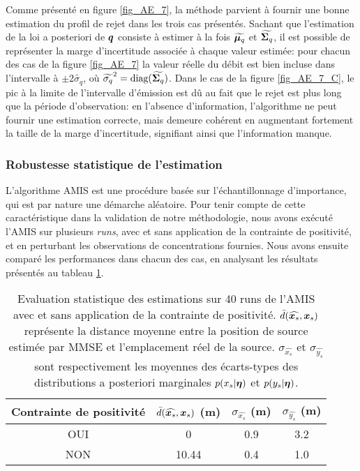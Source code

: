  Comme présenté en figure \ref{fig_AE_7}, la méthode parvient à fournir une bonne estimation du profil de rejet dans les trois cas présentés. Sachant que l'estimation de la loi a posteriori de ${\bm{q}}$ consiste à estimer à la fois ${\widetilde{{\bm{\mu}_q}}}$ et ${\widetilde{{\bm{\Sigma}_q}}}$, il est possible de représenter la marge d'incertitude associée à chaque valeur estimée: pour chacun des cas de la figure \ref{fig_AE_7} la valeur réelle du débit est bien incluse dans l'intervalle à $\pm 2\widetilde{\sigma_q}$, où $\widetilde{\sigma_q}^2 = \text{diag}({\widetilde{{\bm{\Sigma}_q}}})$. Dans le cas de la figure \ref{fig_AE_7_C}, le pic à la limite de l'intervalle d'émission est dû au fait que le rejet est plus long que la période d'observation: en l'absence d'information, l'algorithme ne peut fournir une estimation correcte, mais demeure cohérent  en augmentant fortement la taille de la marge d'incertitude, signifiant ainsi que l'information manque. \\
  
  \subsubsection{Robustesse statistique de l'estimation}
    
    L'algorithme AMIS est une procédure basée sur l'échantillonnage d'importance, qui est par nature une démarche aléatoire. Pour tenir compte de cette caractéristique dans la validation de notre méthodologie, nous avons exécuté l'AMIS sur plusieurs \textit{runs}, avec et sans application de la contrainte de positivité, et en perturbant les observations de concentrations fournies. Nous avons ensuite comparé les performances dans chacun des cas, en analysant les résultats présentés au tableau \ref{table_1_AE}. 
    
    \begin{table}[h!]
    	\centering
    	
    	\begin{tabular}{cccc}
    		
    		Contrainte de positivité & $\bar{d}(\widehat{{\bm{x}_s}},{\bm{x}_s})$ (m)& $\sigma_{\widehat{x_s}}$ (m)& $\sigma_{\widehat{y_s}}$ (m)\\
    		\hline
    		OUI                   & 0  	& 0.9        & 3.2        \\
    		NON                   & 10.44   & 0.4        & 1.0 \\      
    		\hline
    	\end{tabular}
    	\caption{Evaluation statistique des estimations sur 40 runs de l'AMIS avec et sans application de la contrainte de positivité. $\bar{d}(\widehat{{\bm{x}_s}},{\bm{x}_s})$ représente la distance moyenne entre la position de source estimée par MMSE et l'emplacement réel de la source. $\sigma_{\widehat{x_s}}$ et $\sigma_{\widehat{y_s}}$ sont respectivement les moyennes des écarts-types des distributions a posteriori marginales $p(x_s | {\bm{\eta}})$ et $p(y_s | {\bm{\eta}})$. }
    	\label{table_1_AE}
    \end{table}
    
